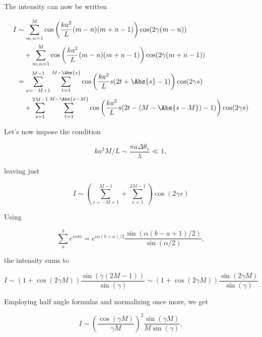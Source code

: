 {The intensity can now be written

\begin{equation}\label{eqn:modernOptics:problemSet3:3:800}
\begin{aligned}
I
&\sim
\sum_{m,n = 1}^{M} 
\cos\left( 
   \frac{k a^2}{L} 
	(m - n) (m + n - 1)
\right)
\cos (2 \gamma (m - n)) \\
&\quad + 
\sum_{m,n = 1}^{M} 
\cos\left( 
   \frac{k a^2}{L} 
	(m - n) (m + n - 1)
\right)
\cos (2 \gamma (m + n - 1)) \\
&=
\sum_{s = -M + 1}^{M - 1} \sum_{t = 1}^{M - \Abs{s}} 
\cos\left( 
   \frac{k a^2}{L} 
	s ( 2 t + \Abs{s} - 1 )
\right)
\cos (2 \gamma s) \\
&\quad + 
\sum_{s = 1}^{2 M - 1} \sum_{t = 1}^{M - \Abs{s - M}} 
\cos\left( 
   \frac{k a^2}{L} 
	s ( 2 t - (M - \Abs{s - M}) -1)
\right)
\cos (2 \gamma s)
\end{aligned}
\end{equation}

Let's now impose the condition

\begin{dmath}\label{eqn:modernOptics:problemSet3:3:820}
k a^2 M/L \sim \frac{\pi a \Delta \theta_s }{\lambda} \ll 1,
\end{dmath}

leaving just

\begin{dmath}\label{eqn:modernOptics:problemSet3:3:840}
I \sim
\left( \sum_{s = -M + 1}^{M - 1} 
+
\sum_{s = 1}^{2 M - 1} \right)
\cos ( 2 \gamma s)
\end{dmath}

Using

\begin{dmath}\label{eqn:modernOptics:problemSet3:3:860}
\sum_a^b e^{i \alpha m} = e^{i \alpha (b + a)/2} \frac{\sin(\alpha (b - a + 1)/2)}{\sin( \alpha/2)},
\end{dmath}

the intensity sums to

\begin{dmath}\label{eqn:modernOptics:problemSet3:3:880}
I \sim
(1 + \cos( 2 \gamma M ) ) 
\frac{\sin(\gamma (2 M - 1))}{\sin( \gamma)}
\sim
(1 + \cos( 2 \gamma M ) ) 
\frac{\sin(2 \gamma M) }{\sin( \gamma )}
\end{dmath}

Employing half angle formulas and normalizing once more, we get

\begin{dmath}\label{eqn:modernOptics:problemSet3:3:900}
I \sim \left( \frac{\cos( \gamma M )}{\gamma M} \right)^2 \frac{\sin(\gamma M) }{ M \sin( \gamma)},
\end{dmath}

}

